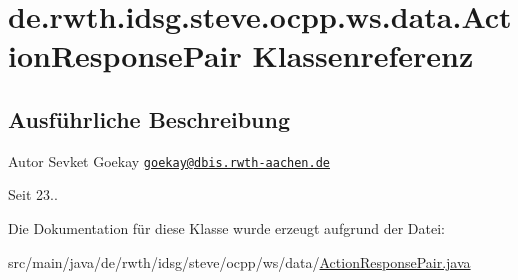 \hypertarget{classde_1_1rwth_1_1idsg_1_1steve_1_1ocpp_1_1ws_1_1data_1_1_action_response_pair}{\section{de.\+rwth.\+idsg.\+steve.\+ocpp.\+ws.\+data.\+Action\+Response\+Pair Klassenreferenz}
\label{classde_1_1rwth_1_1idsg_1_1steve_1_1ocpp_1_1ws_1_1data_1_1_action_response_pair}
}


\subsection{Ausführliche Beschreibung}
\begin{DoxyAuthor}{Autor}
Sevket Goekay \href{mailto:goekay@dbis.rwth-aachen.de}{\tt goekay@dbis.\+rwth-\/aachen.\+de} 
\end{DoxyAuthor}
\begin{DoxySince}{Seit}
23.. 
\end{DoxySince}


Die Dokumentation für diese Klasse wurde erzeugt aufgrund der Datei\+:\begin{DoxyCompactItemize}
\item 
src/main/java/de/rwth/idsg/steve/ocpp/ws/data/\hyperlink{_action_response_pair_8java}{Action\+Response\+Pair.\+java}\end{DoxyCompactItemize}
